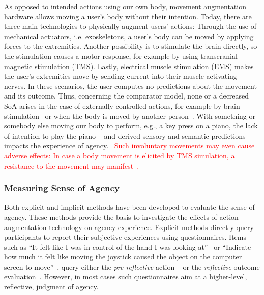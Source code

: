 As opposed to intended actions using our own body, movement augmentation hardware allows moving a user's body without their intention. Today, there are three main technologies to physically augment users' actions: Through the use of mechanical actuators, i.e. exoskeletons, a user's body can be moved by applying forces to the extremities. Another possibility is to stimulate the brain directly, so the stimulation causes a motor response, for example by using transcranial magnetic stimulation (TMS). Lastly, electrical muscle stimulation (EMS) makes the user's extremities move by sending current into their muscle-activating nerves. In these scenarios, the user computes no predictions about the movement and its outcome. Thus, concerning the comparator model, none or a decreased SoA arises in the case of externally controlled actions, for example by brain stimulation~\cite{Haggard2002-sz} or when the body is moved by another person~\cite{Kuhn2013-ls}. With something or somebody else moving our body to perform, e.g., a key press on a piano, the lack of intention to play the piano -- and derived sensory and semantic predictions -- impacts the experience of agency. ~\textcolor{red}{Such involuntary movements may even cause adverse effects: In case a body movement is elicited by TMS simulation, a resistance to the movement may manifest~\cite{Haggard2002-sz}.}

\subsubsection{Measuring Sense of Agency}
Both explicit and implicit methods have been developed to evaluate the sense of agency. These methods provide the basis to investigate the effects of action augmentation technology on agency experience. Explicit methods directly query participants to report their subjective experiences using questionnaires. Items such as ``It felt like I was in control of the hand I was looking at''~\cite{Haggard2002-sz} or ``Indicate how much it felt like moving the joystick caused the object on the computer screen to move''~\cite{Ebert2010-lu}, query either the \textit{pre-reflective} action -- or the \textit{reflective} outcome evaluation~\cite{Moore2012-dk}. However, in most cases such questionnaires aim at a higher-level, reflective, judgment of agency. 

